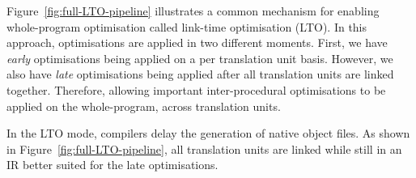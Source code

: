 Figure~\ref{fig:full-LTO-pipeline} illustrates a common mechanism for enabling whole-program optimisation called link-time optimisation (LTO).
In this approach, optimisations are applied in two different moments.
First, we have \textit{early} optimisations being applied on a per translation unit basis.
However, we also have \textit{late} optimisations being applied after all translation units are linked together.
Therefore, allowing important inter-procedural optimisations to be applied on the whole-program, across translation units.

In the LTO mode, compilers delay the generation of native object files.
As shown in Figure~\ref{fig:full-LTO-pipeline}, all translation units are linked while still in an IR better suited for the late optimisations.
